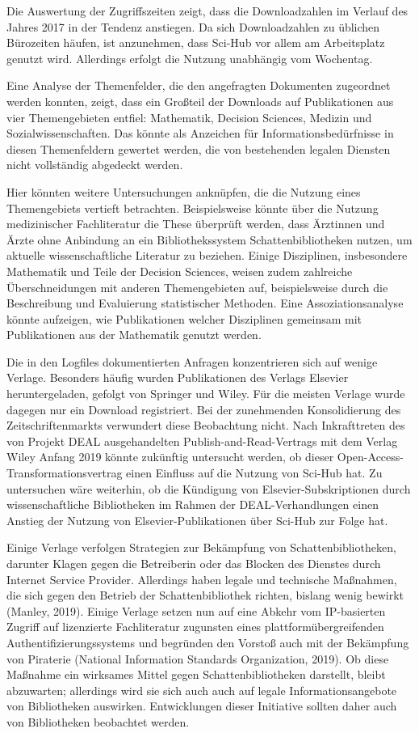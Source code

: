 \documentclass[a4paper,
fontsize=11pt,
oneside,
numbers=noperiodatend,
parskip=half-,
bibliography=totoc,
final
]{scrartcl}
\begin{document}
Die Auswertung der Zugriffszeiten zeigt, dass die Downloadzahlen im
Verlauf des Jahres 2017 in der Tendenz anstiegen. Da sich Downloadzahlen
zu üblichen Bürozeiten häufen, ist anzunehmen, dass Sci-Hub vor allem am
Arbeitsplatz genutzt wird. Allerdings erfolgt die Nutzung unabhängig vom
Wochentag.

Eine Analyse der Themenfelder, die den angefragten Dokumenten zugeordnet
werden konnten, zeigt, dass ein Großteil der Downloads auf Publikationen
aus vier Themengebieten entfiel: Mathematik, Decision Sciences, Medizin
und Sozialwissenschaften. Das könnte als Anzeichen für
Informationsbedürfnisse in diesen Themenfeldern gewertet werden, die von
bestehenden legalen Diensten nicht vollständig abgedeckt werden.

Hier könnten weitere Untersuchungen anknüpfen, die die Nutzung eines
Themengebiets vertieft betrachten. Beispielsweise könnte über die
Nutzung medizinischer Fachliteratur die These überprüft werden, dass
Ärztinnen und Ärzte ohne Anbindung an ein Bibliothekssystem
Schattenbibliotheken nutzen, um aktuelle wissenschaftliche Literatur zu
beziehen. Einige Disziplinen, insbesondere Mathematik und Teile der
Decision Sciences, weisen zudem zahlreiche Überschneidungen mit anderen
Themengebieten auf, beispielsweise durch die Beschreibung und
Evaluierung statistischer Methoden. Eine Assoziationsanalyse könnte
aufzeigen, wie Publikationen welcher Disziplinen gemeinsam mit
Publikationen aus der Mathematik genutzt werden.

Die in den Logfiles dokumentierten Anfragen konzentrieren sich auf
wenige Verlage. Besonders häufig wurden Publikationen des Verlags
Elsevier heruntergeladen, gefolgt von Springer und Wiley. Für die
meisten Verlage wurde dagegen nur ein Download registriert. Bei der
zunehmenden Konsolidierung des Zeitschriftenmarkts verwundert diese
Beobachtung nicht. Nach Inkrafttreten des von Projekt DEAL
ausgehandelten Publish-and-Read-Vertrags mit dem Verlag Wiley Anfang
2019 könnte zukünftig untersucht werden, ob dieser
Open-Access-Transformationsver\-trag einen Einfluss auf die Nutzung von
Sci-Hub hat. Zu untersuchen wäre weiterhin, ob die Kündigung von
Elsevier-Subskriptionen durch wissenschaftliche Bibliotheken im Rahmen
der DEAL-Verhandlungen einen Anstieg der Nutzung von
Elsevier-Publikationen über Sci-Hub zur Folge hat.

Einige Verlage verfolgen Strategien zur Bekämpfung von
Schattenbibliotheken, darunter Klagen gegen die Betreiberin oder das
Blocken des Dienstes durch Internet Service Provider. Allerdings haben
legale und technische Maßnahmen, die sich gegen den Betrieb der
Schattenbibliothek richten, bislang wenig bewirkt (Manley, 2019). Einige
Verlage setzen nun auf eine Abkehr vom IP-basierten Zugriff auf
lizenzierte Fachliteratur zugunsten eines plattformübergreifenden
Authentifizierungssystems und begründen den Vorstoß auch mit der
Bekämpfung von Piraterie (National Information Standards Organization,
2019). Ob diese Maßnahme ein wirksames Mittel gegen Schattenbibliotheken
darstellt, bleibt abzuwarten; allerdings wird sie sich auch auch auf
legale Informationsangebote von Bibliotheken auswirken. Entwicklungen
dieser Initiative sollten daher auch von Bibliotheken beobachtet werden.
\end{document}
